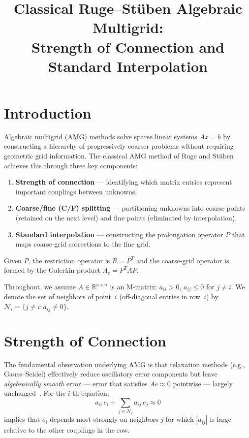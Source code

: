 \documentclass[11pt]{article}
\title{Classical Ruge--St\"uben Algebraic Multigrid:\\
  Strength of Connection and Standard Interpolation}
\author{}
\date{}
\newcommand{\R}{\mathbb{R}}
\newcommand{\NN}{\mathcal{N}}
\begin{document}
\maketitle

\section{Introduction}

Algebraic multigrid (AMG) methods solve sparse linear systems $Ax = b$
by constructing a hierarchy of progressively coarser problems without
requiring geometric grid information.  The classical AMG method of Ruge
and St\"uben~\cite{RS1987} achieves this through three key components:
\begin{enumerate}
  \item \textbf{Strength of connection} --- identifying which matrix
    entries represent important couplings between unknowns.
  \item \textbf{Coarse/fine (C/F) splitting} --- partitioning unknowns
    into coarse points (retained on the next level) and fine points
    (eliminated by interpolation).
  \item \textbf{Standard interpolation} --- constructing the prolongation
    operator $P$ that maps coarse-grid corrections to the fine grid.
\end{enumerate}
Given $P$, the restriction operator is $R = P^T$ and the coarse-grid
operator is formed by the Galerkin product $A_c = P^T A P$.

Throughout, we assume $A \in \R^{n \times n}$ is an M-matrix: $a_{ii} > 0$,
$a_{ij} \le 0$ for $j \ne i$.  We denote the set of neighbors of point~$i$
(off-diagonal entries in row~$i$) by $\NN_i = \{j \ne i : a_{ij} \ne 0\}$.

\section{Strength of Connection}
\label{sec:strength}

The fundamental observation underlying AMG is that relaxation methods
(e.g., Gauss--Seidel) effectively reduce oscillatory error components
but leave \emph{algebraically smooth} error --- error that satisfies
$Ae \approx 0$ pointwise --- largely unchanged~\cite{RS1987,Stuben2001}.
For the $i$-th equation,
\[
  a_{ii}\,e_i + \sum_{j \in \NN_i} a_{ij}\,e_j \approx 0
\]
implies that $e_i$ depends most strongly on neighbors $j$ for which
$|a_{ij}|$ is large relative to the other couplings in the row.
\end{document}
